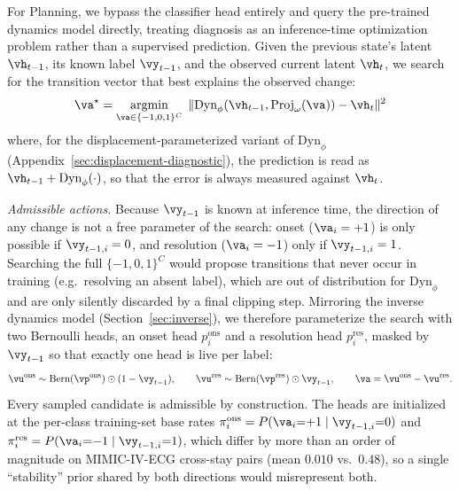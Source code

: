 For Planning, we bypass the classifier head entirely and query the pre-trained dynamics model directly, treating diagnosis as an inference-time optimization problem rather than a supervised prediction. Given the previous state's latent $\vh_{t-1}$, its known label $\vy_{t-1}$, and the observed current latent $\vh_t$, we search for the transition vector that best explains the observed change:
$$ \va^\star = \operatorname*{argmin}_{\va \in \{-1,0,1\}^C} \; \| \text{Dyn}_\phi(\vh_{t-1}, \text{Proj}_\omega(\va)) - \vh_t \|^2 $$
where, for the displacement-parameterized variant of $\text{Dyn}_\phi$ (Appendix~\ref{sec:displacement-diagnostic}), the prediction is read as $\vh_{t-1}+\text{Dyn}_\phi(\cdot)$, so that the error is always measured against $\vh_t$.

\emph{Admissible actions.} Because $\vy_{t-1}$ is known at inference time, the direction of any change is not a free parameter of the search: onset ($\va_i=+1$) is only possible if $\vy_{t-1,i}=0$, and resolution ($\va_i=-1$) only if $\vy_{t-1,i}=1$. Searching the full $\{-1,0,1\}^C$ would propose transitions that never occur in training (e.g.\ resolving an absent label), which are out of distribution for $\text{Dyn}_\phi$ and are only silently discarded by a final clipping step. Mirroring the inverse dynamics model (Section~\ref{sec:inverse}), we therefore parameterize the search with two Bernoulli heads, an onset head $p^{\text{ons}}_i$ and a resolution head $p^{\text{res}}_i$, masked by $\vy_{t-1}$ so that exactly one head is live per label:
$$ \vu^{\text{ons}} \sim \text{Bern}(\vp^{\text{ons}}) \odot (1-\vy_{t-1}), \qquad \vu^{\text{res}} \sim \text{Bern}(\vp^{\text{res}}) \odot \vy_{t-1}, \qquad \va = \vu^{\text{ons}} - \vu^{\text{res}}. $$
Every sampled candidate is admissible by construction. The heads are initialized at the per-class training-set base rates $\pi^{\text{ons}}_i = P(\va_i{=}{+1}\mid \vy_{t-1,i}{=}0)$ and $\pi^{\text{res}}_i = P(\va_i{=}{-1}\mid \vy_{t-1,i}{=}1)$, which differ by more than an order of magnitude on MIMIC-IV-ECG cross-stay pairs (mean $0.010$ vs.\ $0.48$), so a single ``stability'' prior shared by both directions would misrepresent both.


